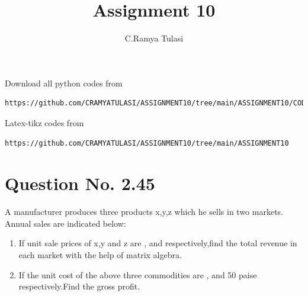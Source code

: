 \documentclass[journal,12pt,twocolumn]{IEEEtran}
\begin{document}
     \def\rightbox#1{\makebox[0in][r]{#1}}
     \def\centbox#1{\makebox[0in]{#1}}
     \def\topbox#1{\raisebox{-\baselineskip}[0in][0in]{#1}}
     \def\midbox#1{\raisebox{-0.5\baselineskip}[0in][0in]{#1}}
\vspace{3cm}
\title{Assignment 10}
\author{C.Ramya Tulasi}
\maketitle
\newpage
\bigskip
\renewcommand{\thefigure}{\theenumi}
\renewcommand{\thetable}{\theenumi}
Download all python codes from 
\begin{lstlisting}
https://github.com/CRAMYATULASI/ASSIGNMENT10/tree/main/ASSIGNMENT10/CODES
\end{lstlisting}
%
Latex-tikz codes from 
%
\begin{lstlisting}
https://github.com/CRAMYATULASI/ASSIGNMENT10/tree/main/ASSIGNMENT10
\end{lstlisting}
%
\section{Question No. 2.45}

A manufacturer produces three products x,y,z which he sells in two markets. Annual sales are indicated below:
\begin{table}[!ht]
\centering
\end{table}

\begin{enumerate}
\item If unit sale prices of x,y and z are , and  respectively,find the total revenue in each market with the help of matrix algebra.
\item If the unit cost of the above three commodities are , and 50 paise respectively.Find the gross profit.
\end{enumerate}
\end{document}
